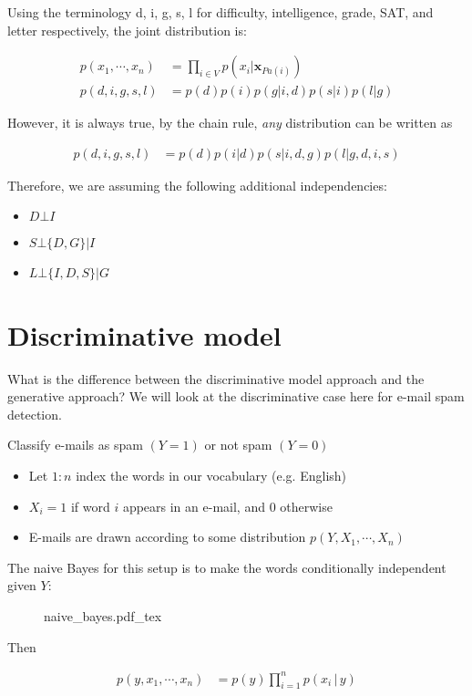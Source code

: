 \documentclass{article}
\begin{document}
Using the terminology d, i, g, s, l for difficulty, intelligence, grade, SAT, and letter respectively, the joint distribution is:

\begin{align}
    p(x_{1}, \cdots , x_{n}) &= \prod_{i \in V} p(x_{i} | \boldsymbol{x}_{Pa(i)}) \\
    p(d,i,g,s,l) &= p(d)p(i)p(g | i,d)p(s | i)p(l | g)
\end{align}

However, it is always true, by the chain rule, \textit{any} distribution can be written as

\begin{align}
    p(d, i, g, s, l) &= p (d)p(i | d)p(s | i, d, g)p(l | g,d,i, s)
\end{align}

Therefore, we are assuming the following additional independencies:

\begin{itemize}
    \item $ D \bot I $
    \item $ S \bot \{D, G\} | I $
    \item $ L \bot \{ I, D, S \} | G $
\end{itemize}

\section{Discriminative model}

What is the difference between the discriminative model approach and the generative approach?  We will look at the discriminative case here for e-mail spam detection.

Classify e-mails as spam $(Y = 1)$ or not spam $(Y = 0)$
\begin{itemize}
    \item Let $ 1 : n $ index the words in our vocabulary (e.g. English)
    \item $ X_{i} = 1 $ if word $i$ appears in an e-mail, and $0$ otherwise
    \item E-mails are drawn according to some distribution $ p(Y, X_{1}, \cdots , X_{n})$
\end{itemize}

The naive Bayes for this setup is to make the words conditionally independent given $Y$:

\begin{figure}[hbt!]
    \centering
    \begin{normalsize}
        {naive_bayes.pdf_tex}
    \end{normalsize}
    \label{fig:Naive Bayes for Spam detection}
\end{figure}

Then

\begin{align}
    p(y, x_{1}, \cdots , x_{n}) &= p(y) \prod_{i=1}^{n}p(x_{i}\,| \,y)
\end{align}
\end{document}
